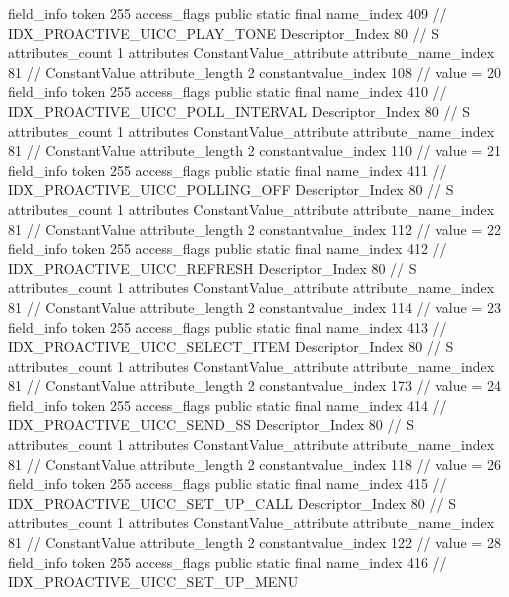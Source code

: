 {{{{{{{				}
				}
			}
			field_info {
				token	255
				access_flags	public static final
				name_index	409		// IDX_PROACTIVE_UICC_PLAY_TONE
				Descriptor_Index	80		// S
				attributes_count	1
				attributes {
				ConstantValue_attribute {
					attribute_name_index	81		// ConstantValue
					attribute_length	2
					constantvalue_index	108		// value = 20
				}
				}
			}
			field_info {
				token	255
				access_flags	public static final
				name_index	410		// IDX_PROACTIVE_UICC_POLL_INTERVAL
				Descriptor_Index	80		// S
				attributes_count	1
				attributes {
				ConstantValue_attribute {
					attribute_name_index	81		// ConstantValue
					attribute_length	2
					constantvalue_index	110		// value = 21
				}
				}
			}
			field_info {
				token	255
				access_flags	public static final
				name_index	411		// IDX_PROACTIVE_UICC_POLLING_OFF
				Descriptor_Index	80		// S
				attributes_count	1
				attributes {
				ConstantValue_attribute {
					attribute_name_index	81		// ConstantValue
					attribute_length	2
					constantvalue_index	112		// value = 22
				}
				}
			}
			field_info {
				token	255
				access_flags	public static final
				name_index	412		// IDX_PROACTIVE_UICC_REFRESH
				Descriptor_Index	80		// S
				attributes_count	1
				attributes {
				ConstantValue_attribute {
					attribute_name_index	81		// ConstantValue
					attribute_length	2
					constantvalue_index	114		// value = 23
				}
				}
			}
			field_info {
				token	255
				access_flags	public static final
				name_index	413		// IDX_PROACTIVE_UICC_SELECT_ITEM
				Descriptor_Index	80		// S
				attributes_count	1
				attributes {
				ConstantValue_attribute {
					attribute_name_index	81		// ConstantValue
					attribute_length	2
					constantvalue_index	173		// value = 24
				}
				}
			}
			field_info {
				token	255
				access_flags	public static final
				name_index	414		// IDX_PROACTIVE_UICC_SEND_SS
				Descriptor_Index	80		// S
				attributes_count	1
				attributes {
				ConstantValue_attribute {
					attribute_name_index	81		// ConstantValue
					attribute_length	2
					constantvalue_index	118		// value = 26
				}
				}
			}
			field_info {
				token	255
				access_flags	public static final
				name_index	415		// IDX_PROACTIVE_UICC_SET_UP_CALL
				Descriptor_Index	80		// S
				attributes_count	1
				attributes {
				ConstantValue_attribute {
					attribute_name_index	81		// ConstantValue
					attribute_length	2
					constantvalue_index	122		// value = 28
				}
				}
			}
			field_info {
				token	255
				access_flags	public static final
				name_index	416		// IDX_PROACTIVE_UICC_SET_UP_MENU
}}}}}
